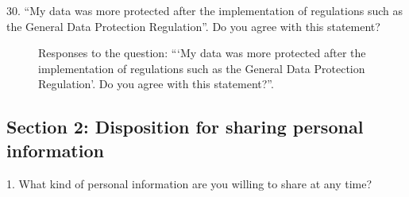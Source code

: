 30. ``My data was more protected after the implementation of regulations such as the General Data Protection Regulation''. Do you agree with this statement?

\begin{figure}[H]
    \begin{center}
        \caption*{Responses to the question: ```My data was more protected after the implementation of regulations such as the General Data Protection Regulation'. Do you agree with this statement?''.}
        \label{fig:survey_s1_q30}
    \end{center}
\end{figure}

\clearpage

\subsection*{Section 2: Disposition for sharing personal information}

1. What kind of personal information are you willing to share at any time?

